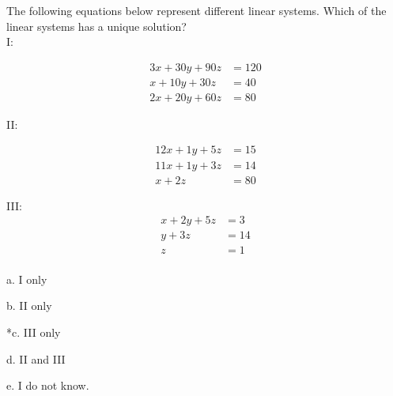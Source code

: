 
The following equations below represent different linear systems. Which of the linear systems has a unique solution?\\

I:

\begin{align*}
    3x + 30y + 90z &= 120 \\
    x + 10y + 30z &= 40 \\
    2x + 20y + 60z &= 80 
\end{align*}



II:

\begin{align*}
  12x + 1y + 5z &= 15 \\
  11x + 1y + 3z &= 14 \\
   x  + 2z  &= 80 
\end{align*}

III:
\begin{align*}
    x + 2y + 5z &= 3 \\
    y + 3z &= 14 \\
    z &= 1
\end{align*}\\

a. I only

b. II only

*c. III only

d. II and III

e. I do not know.\\
